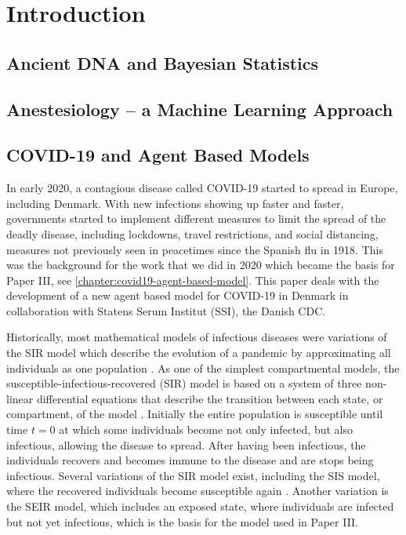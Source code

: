 
\chapter{Introduction}



\section{Ancient DNA and Bayesian Statistics}
\label{section:ancientDNA}



\section{Anestesiology -- a Machine Learning Approach }
\label{section:machine-learning}



\section{COVID-19 and Agent Based Models}
\label{section:agent-based-models}

In early 2020, a contagious disease called COVID-19 started to spread in Europe, including Denmark. With new infections showing up faster and faster, governments started to implement different measures to limit the spread of the deadly disease, including lockdowns, travel restrictions, and social distancing, measures not previously seen in peacetimes since the Spanish flu in 1918. This was the background for the work that we did in 2020 which became the basis for Paper III, see \autoref{chapter:covid19-agent-based-model}. This paper deals with the development of a new agent based model for COVID-19 in Denmark in collaboration with Statens Serum Institut (SSI), the Danish CDC.

Historically, most mathematical models of infectious diseases were variations of the SIR model which describe the evolution of a pandemic by approximating all individuals as one population \autocite{kermackContributionMathematicalTheory1927}.
As one of the simplest compartmental models, the susceptible-infectious-recovered (SIR) model is based on a system of three non-linear differential equations that describe the transition between each state, or compartment, of the model \autocite{krogerAnalyticalSolutionSIRmodel2020}. Initially the entire population is susceptible until time $t=0$ at which some individuals become not only infected, but also infectious, allowing the disease to spread. After having been infectious, the individuals recovers and becomes immune to the disease and are stops being infectious. Several variations of the SIR model exist, including the SIS model, where the recovered individuals become susceptible again \autocite{hethcoteThreeBasicEpidemiological1989}. Another variation is the SEIR model, which includes an exposed state, where individuals are infected but not yet infectious, which is the basis for the model used in Paper III.


